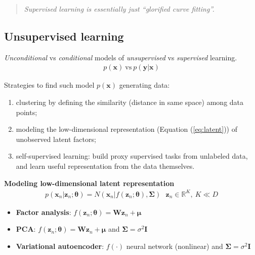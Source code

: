 \begin{quote}\textit{
    Supervised learning is essentially just ``glorified curve fitting''.
}\end{quote}

\subsection{Unsupervised learning}

\textit{Unconditional} vs \textit{conditional}
models of \textit{unsupervised} vs \textit{supervised} learning.
\begin{gather}
    p(\bm{x})~\text{vs}~p(\bm{y}|\bm{x})
\end{gather}

    Strategies to find such model $p(\bm{x})$ generating data:
    \begin{enumerate}
        \item clustering by defining the similarity (distance in same space) among data points; 
        \item modeling the low-dimensional representation (Equation (\ref{eq:latent})) 
        of unobserved latent factors;
        \item self-supervised learning: 
        build proxy supervised tasks from unlabeled data, and 
        learn useful representation from the data themselves.
    \end{enumerate}

\begin{example}
    \textbf{Modeling low-dimensional latent representation}\\
    \begin{gather}
        p(\bm{x}_n|\bm{z}_n;\bm{\theta})
        =N(\bm{x}_n|f(\bm{z}_n;\bm{\theta}),\bm{\Sigma})
        ~~~\bm{z}_n\in\mathbb{R}^K,~K\ll{D}
        \label{eq:latent}
    \end{gather}
    \begin{itemize}
        \item \textbf{Factor analysis}: 
        $f(\bm{z}_n;\bm{\theta})=\bm{W}\bm{z}_n+\bm{\mu}$
        \item \textbf{PCA}:
        $f(\bm{z}_n;\bm{\theta})=\bm{W}\bm{z}_n+\bm{\mu}$ and 
        $\bm{\Sigma}=\sigma^2\bm{I}$
        \item \textbf{Variational autoencoder}:
        $f(\cdot)$ neural network (nonlinear) and
        $\bm{\Sigma}=\sigma^2\bm{I}$
    \end{itemize}
\end{example}

